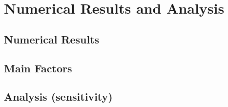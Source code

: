 \section{Numerical Results and Analysis} %
\label{sec:numerical_results}

\subsection{Numerical Results} %
\label{sub:effect_of_1}


\subsection{Main Factors} %
\label{sub:main_factors}


\subsection{Analysis (sensitivity)} %
\label{sub:analysis}

